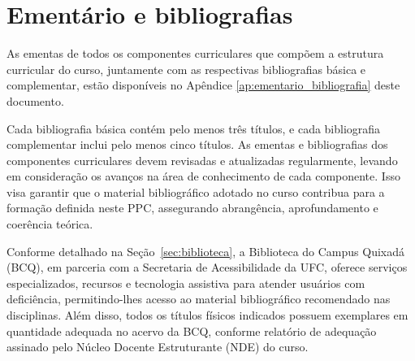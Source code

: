 \begin{table}[h]
\centering
\caption{Carga horária por semestre do curso e prazos de conclusão}
\vspace{1em}
\renewcommand{\arraystretch}{1.5}
\end{table}


\clearpage
\section{Ementário e bibliografias}

As ementas de todos os componentes curriculares que compõem a estrutura curricular do curso, juntamente com as respectivas bibliografias básica e complementar, estão disponíveis no Apêndice \ref{ap:ementario_bibliografia} deste documento. 

Cada bibliografia básica contém pelo menos três títulos, e cada bibliografia complementar inclui pelo menos cinco títulos. As ementas e bibliografias dos componentes curriculares devem revisadas e atualizadas regularmente, levando em consideração os avanços na área de conhecimento de cada componente. Isso visa garantir que o material bibliográfico adotado no curso contribua para a formação definida neste PPC, assegurando abrangência, aprofundamento e coerência teórica.

Conforme detalhado na Seção~\ref{sec:biblioteca}, a Biblioteca do Campus Quixadá (BCQ), em parceria com a Secretaria de Acessibilidade da UFC, oferece serviços especializados, recursos e tecnologia assistiva para atender usuários com deficiência, permitindo-lhes acesso ao material bibliográfico recomendado nas disciplinas. Além disso, todos os títulos físicos indicados possuem exemplares em quantidade adequada no acervo da BCQ, conforme relatório de adequação assinado pelo Núcleo Docente Estruturante (NDE) do curso.
